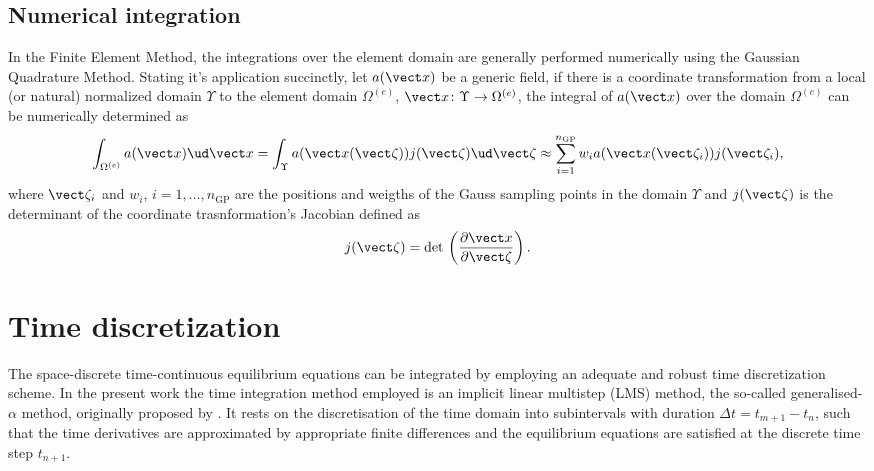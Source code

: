 \subsection{Numerical integration} \label{sec:numerical_integration}

In the Finite Element Method, the integrations over the element domain are generally performed numerically using the Gaussian Quadrature Method.
Stating it's application succinctly, let $a(\vect x)$ be a generic field, if there is a coordinate transformation from a local (or natural) normalized domain $\Upsilon$ to the element domain $\Omega^{(e)}$, $\vect x\colon \Upsilon \to \Omega^{(e)}$, the integral of $a(\vect x)$ over the domain $\Omega^{(e)}$ can be numerically determined as
\begin{equation}
    \int_{\Omega^{(e)} } a(\vect x)\ud \vect x = \int_\Upsilon a(\vect x(\vect \zeta))j(\vect \zeta)\ud \vect \zeta \approx \sum_{i=1}^{n_\text{GP}} w_i a(\vect x(\vect \zeta_i))j(\vect \zeta_i),
\end{equation}
where $\vect \zeta_i$ and $w_i$, $i=1,\dots,n_\text{GP}$ are the positions and weigths of the Gauss sampling points in the domain $\Upsilon$ and $j(\vect \zeta)$ is the determinant of the coordinate trasnformation's Jacobian defined as
\begin{equation}
    j(\vect \zeta) = \text{det}\,\left(\frac{\partial \vect x}{\partial \vect \zeta}\right).
\end{equation}

\section{Time discretization}

The space-discrete time-continuous equilibrium equations can be integrated by employing an adequate and robust time discretization scheme.
In the present work the time integration method employed is an implicit linear multistep (LMS) method, the so-called generalised-\(\alpha\) method, originally proposed by \cite{chung1993time}.
It rests on the discretisation of the time domain into subintervals with duration \(\Delta t=t_{m+1}-t_n\), such that the time derivatives are approximated by appropriate finite differences and the equilibrium equations are satisfied at the discrete time step \(t_{n+1}\).

\newpage\null\thispagestyle{blank}\newpage

